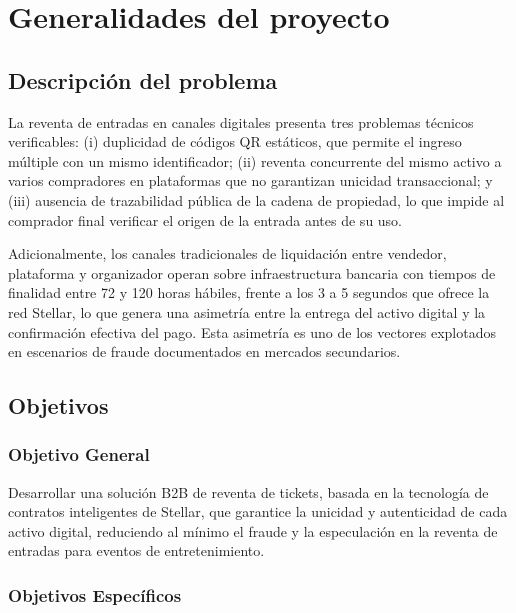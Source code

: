 \newpage
\section{Generalidades del proyecto}

\subsection{Descripción del problema}

La reventa de entradas en canales digitales presenta tres problemas técnicos verificables: (i) duplicidad de códigos QR estáticos, que permite el ingreso múltiple con un mismo identificador; (ii) reventa concurrente del mismo activo a varios compradores en plataformas que no garantizan unicidad transaccional; y (iii) ausencia de trazabilidad pública de la cadena de propiedad, lo que impide al comprador final verificar el origen de la entrada antes de su uso.

Adicionalmente, los canales tradicionales de liquidación entre vendedor, plataforma y organizador operan sobre infraestructura bancaria con tiempos de finalidad entre 72 y 120 horas hábiles, frente a los 3 a 5 segundos que ofrece la red Stellar, lo que genera una asimetría entre la entrega del activo digital y la confirmación efectiva del pago. Esta asimetría es uno de los vectores explotados en escenarios de fraude documentados en mercados secundarios.

\subsection{Objetivos}
\subsubsection{Objetivo General}

Desarrollar una solución B2B de reventa de tickets, basada en la tecnología de contratos inteligentes de Stellar, que garantice la unicidad y autenticidad de cada activo digital, reduciendo al mínimo el fraude y la especulación en la reventa de entradas para eventos de entretenimiento.


\subsubsection{Objetivos Específicos}

